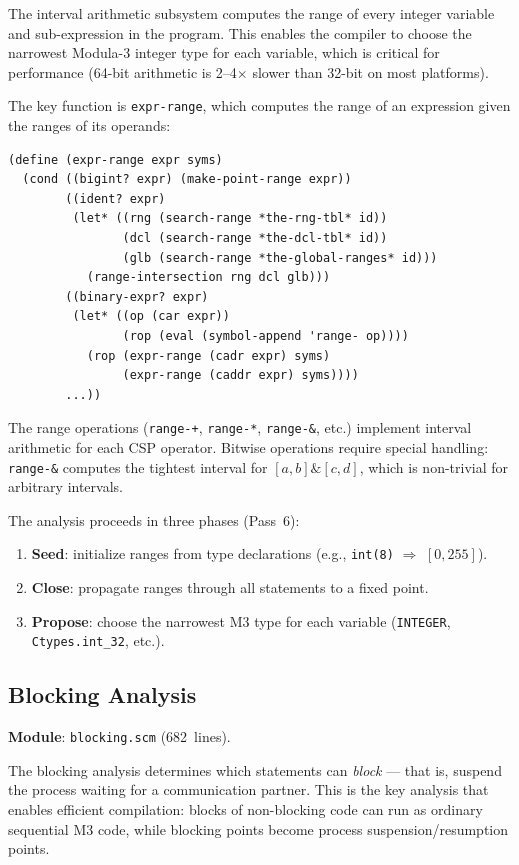 \documentclass[11pt,letterpaper]{article}
\begin{document}
The interval arithmetic subsystem computes the range of every
integer variable and sub-expression in the program.  This enables
the compiler to choose the narrowest Modula-3 integer type for each
variable, which is critical for performance (64-bit arithmetic is
2--4$\times$ slower than 32-bit on most platforms).

The key function is \texttt{expr-range}, which computes the range
of an expression given the ranges of its operands:

\begin{lstlisting}
(define (expr-range expr syms)
  (cond ((bigint? expr) (make-point-range expr))
        ((ident? expr)
         (let* ((rng (search-range *the-rng-tbl* id))
                (dcl (search-range *the-dcl-tbl* id))
                (glb (search-range *the-global-ranges* id)))
           (range-intersection rng dcl glb)))
        ((binary-expr? expr)
         (let* ((op (car expr))
                (rop (eval (symbol-append 'range- op))))
           (rop (expr-range (cadr expr) syms)
                (expr-range (caddr expr) syms))))
        ...))
\end{lstlisting}

The range operations (\texttt{range-+}, \texttt{range-*},
\texttt{range-\&}, etc.) implement interval arithmetic for each
CSP operator.  Bitwise operations require special handling:
\texttt{range-\&} computes the tightest interval for $[a,b]
\mathbin{\&} [c,d]$, which is non-trivial for arbitrary intervals.

The analysis proceeds in three phases (Pass~6):
\begin{enumerate}[nosep]
  \item \textbf{Seed}: initialize ranges from type declarations
    (e.g., \texttt{int(8)} $\Rightarrow$ $[0, 255]$).
  \item \textbf{Close}: propagate ranges through all statements
    to a fixed point.
  \item \textbf{Propose}: choose the narrowest M3 type for each
    variable (\texttt{INTEGER}, \texttt{Ctypes.int\_32}, etc.).
\end{enumerate}

\subsection{Blocking Analysis}
\label{sec:blocking}

\textbf{Module}: \texttt{blocking.scm} (682~lines).

The blocking analysis determines which statements can \emph{block}
--- that is, suspend the process waiting for a communication partner.
This is the key analysis that enables efficient compilation: blocks
of non-blocking code can run as ordinary sequential M3 code, while
blocking points become process suspension/resumption points.
\end{document}
